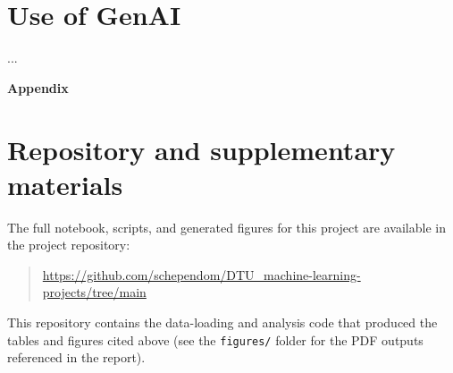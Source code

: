 \documentclass[dtu]{dtuarticle}
\begin{document}
	\section*{Use of GenAI}

	...

	
	

	\vspace*{1cm}
	\appendix

	\LARGE\bfseries Appendix

	\normalsize\normalfont

	\section{Repository and supplementary materials}
	The full notebook, scripts, and generated figures for this project are available in the project repository:
	\begin{quote}
	\url{https://github.com/schependom/DTU\_machine-learning-projects/tree/main}
	\end{quote}
	This repository contains the data-loading and analysis code that produced the tables and figures cited
	above (see the \texttt{figures/} folder for the PDF outputs referenced in the report).
%
%

\end{document}
